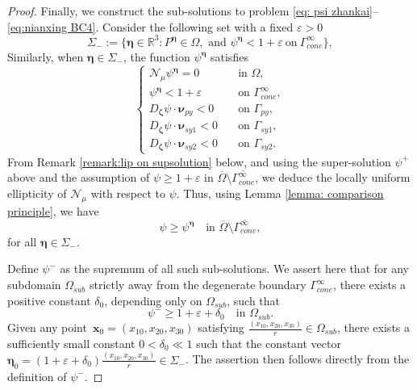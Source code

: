 \documentclass[reqno,12pt]{amsart}
\numberwithin{equation}{section}
\begin{document}
\begin{proof}
   Finally, we construct the sub-solutions to problem \eqref{eq: psi zhankai}--\eqref{eq:nianxing BC4}. Consider the following set with a fixed $\varepsilon>0$
	\begin{equation}\label{eq: Sigma fu}
		\Sigma_{-}:=\{\bm{\eta}\in\mathbb{R}^{3}: P^{\bm{\eta}}\in \Omega,\text{ and }{\psi}^{\bm{\eta}}<1+\varepsilon~\text{on}~\Gamma_{cone}^{\infty}\},
	\end{equation}
  Similarly, when $\bm{\eta}\in {\Sigma}_{-}$, the function ${\psi}^{\bm{\eta}}$ satisfies
	\begin{equation*}
		\begin{cases}
			\mathcal{N}_\mu {\psi}^{\bm{\eta}}= 0\quad&\text{in $\Omega$},\\
			{\psi}^{\bm{\eta}}<1+\varepsilon\quad&\text{on $\Gamma_{cone}^{\infty}$},\\
            D_{\bm{\zeta}}\psi\cdot\bm{\nu}_{py}<0\quad&\text{on $\Gamma_{py}$},\\
			D_{\bm{\zeta}}\psi\cdot\bm{\nu}_{sy1}<0\quad&\text{on $\Gamma_{sy1}$},\\
                D_{\bm{\zeta}}\psi\cdot\bm{\nu}_{sy2}<0\quad&\text{on $\Gamma_{sy2}$}.
		\end{cases}
	\end{equation*}
  From Remark \ref{remark:lip on supsolution} below, and using the super-solution $\psi^+$ above and the assumption of $\psi\geq 1+\varepsilon$ in $\overline{\Omega}\setminus\overline{\Gamma_{cone}^{\infty}}$, we deduce the locally uniform ellipticity of $\mathcal{N}_\mu$ with respect to $\psi$. Thus, using Lemma \ref{lemma: comparison principle}, we have
	\begin{equation}\label{eq1:11}
		{\psi}\geq {\psi}^{\bm{\eta}}\quad\text{in $\overline{\Omega}\setminus\overline{\Gamma_{cone}^{\infty}}$},
	\end{equation}
  for all $\bm{\eta}\in {\Sigma}_{-}$.  
   
    Define $\psi^-$ as the supremum of all such sub-solutions. We assert here that for any subdomain $\Omega_{sub}$ strictly away from the degenerate boundary $\Gamma_{cone}^{\infty}$, there exists a positive constant $\delta_0$, depending only on $\Omega_{sub}$, such that
	\begin{equation}\label{eq1:3.21}
		{\psi}^{-}\geq 1+\varepsilon+\delta_0\quad\text{in $\Omega_{sub}$}.
	\end{equation}
   Given any point~$\bm{x}_{0}=(x_{10},x_{20},x_{30})$ satisfying $\frac{(x_{10},x_{20},x_{30})}{r}\in \Omega_{sub}$, there exists a sufficiently small constant $0<\delta_0\ll 1$ such that the constant vector $\bm{\eta}_{0}=(1+\varepsilon+\delta_0)\frac{(x_{10},x_{20},x_{30})}{r}\in\Sigma_{-}$. The assertion then follows directly from the definition of $\psi^-$.
 

\end{proof}
\end{document}

